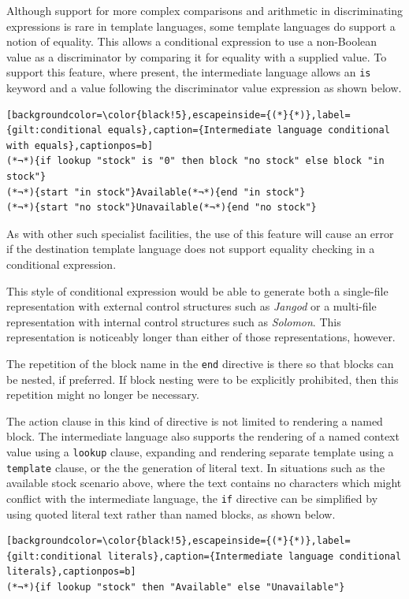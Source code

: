 Although support for more complex comparisons and arithmetic in discriminating expressions is rare in template languages, some template languages do support a notion of equality. This allows a conditional expression to use a non-Boolean value as a discriminator by comparing it for equality with a supplied value. To support this feature, where present, the intermediate language allows an \verb!is! keyword and a value following the discriminator value expression as shown below.

\begin{lstlisting}[backgroundcolor=\color{black!5},escapeinside={(*}{*)},label={gilt:conditional equals},caption={Intermediate language conditional with equals},captionpos=b]
(*¬*){if lookup "stock" is "0" then block "no stock" else block "in stock"}
(*¬*){start "in stock"}Available(*¬*){end "in stock"}
(*¬*){start "no stock"}Unavailable(*¬*){end "no stock"}
\end{lstlisting}

As with other such specialist facilities, the use of this feature will cause an error if the destination template language does not support equality checking in a conditional expression.

This style of conditional expression would be able to generate both a single-file representation with external control structures such as \emph{Jangod} or a multi-file representation with internal control structures such as \emph{Solomon}. This representation is noticeably longer than either of those representations, however.

The repetition of the block name in the \verb!end! directive is there so that blocks can be nested, if preferred. If block nesting were to be explicitly prohibited, then this repetition might no longer be necessary.

The action clause in this kind of directive is not limited to rendering a named block. The intermediate language also supports the rendering of a named context value using a \verb!lookup! clause, expanding and rendering separate template using a \verb!template! clause, or the the generation of literal text. In situations such as the available stock scenario above, where the text contains no characters which might conflict with the intermediate language, the \verb!if! directive can be simplified by using quoted literal text rather than named blocks, as shown below.

\begin{lstlisting}[backgroundcolor=\color{black!5},escapeinside={(*}{*)},label={gilt:conditional literals},caption={Intermediate language conditional literals},captionpos=b]
(*¬*){if lookup "stock" then "Available" else "Unavailable"}
\end{lstlisting}

